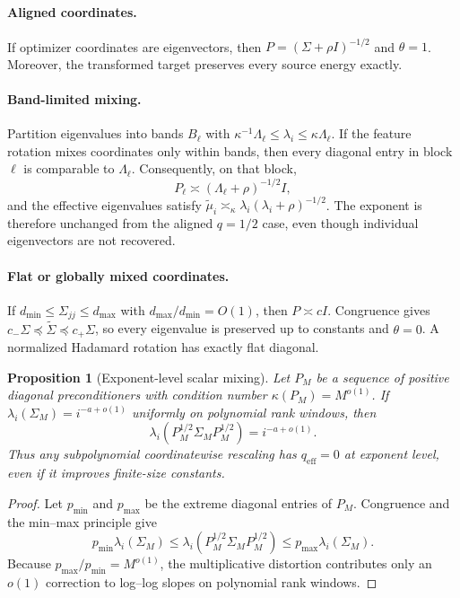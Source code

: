 \documentclass[letterpaper]{article} %
\newtheorem{proposition}{Proposition}
\newcommand{\pre}{\preceq}
\newcommand{\tSig}{\widetilde\Sigma}
\newcommand{\tmu}{\widetilde\mu}
\newcommand{\qeff}{q_{\mathrm{eff}}}
\begin{document}
\paragraph{Aligned coordinates.}
If optimizer coordinates are eigenvectors, then
$P=(\Sigma+\rho I)^{-1/2}$ and $\theta=1$.  Moreover, the transformed target preserves every source energy exactly.

\paragraph{Band-limited mixing.}
Partition eigenvalues into bands $B_\ell$ with
$\kappa^{-1}\Lambda_\ell\le\lambda_i\le\kappa\Lambda_\ell$.
If the feature rotation mixes coordinates only within bands, then every diagonal entry in block $\ell$ is comparable to $\Lambda_\ell$.  Consequently, on that block,
\[
 P_\ell\asymp(\Lambda_\ell+\rho)^{-1/2}I,
\]
and the effective eigenvalues satisfy
$\tmu_i\asymp_\kappa\lambda_i(\lambda_i+\rho)^{-1/2}$.
The exponent is therefore unchanged from the aligned $q=1/2$ case, even though individual eigenvectors are not recovered.

\paragraph{Flat or globally mixed coordinates.}
If
$d_{\min}\le\Sigma_{jj}\le d_{\max}$ with
$d_{\max}/d_{\min}=O(1)$, then
$P\asymp cI$.  Congruence gives
$c_-\Sigma\pre\tSig\pre c_+\Sigma$, so every eigenvalue is preserved up to constants and $\theta=0$.  A normalized Hadamard rotation has exactly flat diagonal.


\begin{proposition}[Exponent-level scalar mixing]
\label{prop:subpoly-mixing}
Let $P_M$ be a sequence of positive diagonal preconditioners with condition number
$\kappa(P_M)=M^{o(1)}$.  If
$\lambda_i(\Sigma_M)=i^{-a+o(1)}$ uniformly on polynomial rank windows, then
\[
 \lambda_i(P_M^{1/2}\Sigma_M P_M^{1/2})
 =i^{-a+o(1)}.
\]
Thus any subpolynomial coordinatewise rescaling has $\qeff=0$ at exponent level, even if it improves finite-size constants.
\end{proposition}

\begin{proof}
Let $p_{\min}$ and $p_{\max}$ be the extreme diagonal entries of $P_M$.  Congruence and the min--max principle give
\[
 p_{\min}\lambda_i(\Sigma_M)
 \le\lambda_i(P_M^{1/2}\Sigma_M P_M^{1/2})
 \le p_{\max}\lambda_i(\Sigma_M).
\]
Because $p_{\max}/p_{\min}=M^{o(1)}$, the multiplicative distortion contributes only an $o(1)$ correction to log--log slopes on polynomial rank windows.
\end{proof}
\end{document}
